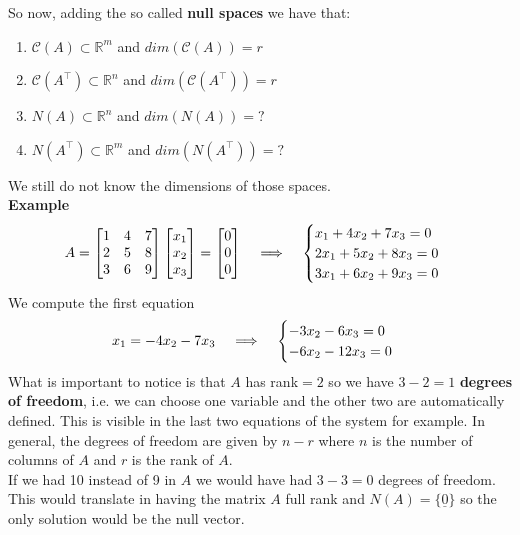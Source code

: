 So now, adding the so called \textbf{null spaces} we have that:
\begin{enumerate}
    \item $\mathcal{C}(A) \subset  \mathbb{R}^m$ and $dim(\mathcal{C}(A)) = r$
    \item $\mathcal{C}(A^\intercal) \subset \mathbb{R}^n$ and $dim(\mathcal{C}(A^\intercal)) = r$
    \item $N(A) \subset \mathbb{R}^n$ and $dim(N(A)) = ?$
    \item $N(A^\intercal) \subset \mathbb{R}^m$ and $dim(N(A^\intercal)) = ?$
\end{enumerate}
We still do not know the dimensions of those spaces. \\

\textbf{Example}\\
\[
A = \begin{bmatrix}
    1 & 4 & 7\\
    2 & 5 & 8\\
    3 & 6 & 9
\end{bmatrix}
\begin{bmatrix}
    x_1\\
    x_2\\
    x_3
\end{bmatrix}
= 
\begin{bmatrix}
    0\\
    0\\
    0
\end{bmatrix}
\hspace{0.3cm} \implies \hspace{0.3cm}
\begin{cases}
    x_1 + 4x_2 + 7x_3 = 0\\
    2x_1 + 5x_2 + 8x_3 = 0\\
    3x_1 + 6x_2 + 9x_3 = 0
\end{cases}    
\]
We compute the first equation
\[
    x_1 = -4x_2 - 7x_3 \hspace{0.3cm} \implies \hspace{0.3cm} \begin{cases}
        -3x_2 - 6x_3 = 0\\
        -6x_2 - 12x_3 = 0
    \end{cases}
\]
What is important to notice is that $A$ has rank$=2$ so we have $3-2=1$  \textbf{degrees of freedom}, i.e. we can choose one variable and the other two are automatically defined. This is visible in the last two equations of the system for example. 
In general, the degrees of freedom are given by $n-r$ where $n$ is the number of columns of $A$ and $r$ is the rank of $A$.\\

If we had 10 instead of 9 in $A$ we would have had $3-3=0$ degrees of freedom. This would translate in having the matrix $A$ full rank and $N(A) = \{\underline{0}\}$ so the only solution would be the null vector.

